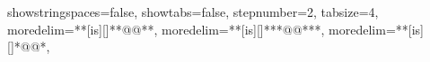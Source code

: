 {  showstringspaces=false,          %
  showtabs=false,                  %
  stepnumber=2,                    %
  tabsize=4,	                   %
  moredelim=**[is][\color{codechanged}]{**@}{@**}, %
  moredelim=**[is][\color{myblue}]{***@}{@***}, %
  moredelim=**[is][\color{mygreen}]{*@}{@*},%
}

\usepackage{hyperref}
\hypersetup{
    colorlinks,
    citecolor=black,
    filecolor=black,
    linkcolor=black,
    urlcolor=black
}

\usepackage{fancyhdr}
\pagestyle{fancy}
\fancyhf{}
\fancyfoot{} %
\fancyhead{} %

\renewcommand{\sectionmark}[1]{\markboth{#1}{}}

\renewcommand{\footrulewidth}{0.0pt} %
\renewcommand{\headrulewidth}{0.0pt} 
\fancyfoot[R]{\textcolor{color1}\thepage  \textcolor{color2}{/\pageref{LastPage}}}
